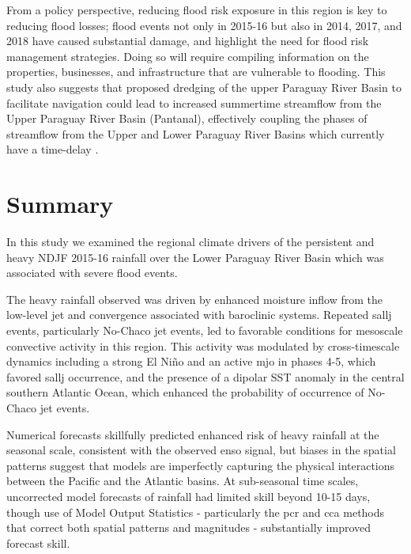 \documentclass[twocol]{ametsoc}
\begin{document}
From a policy perspective, reducing flood risk exposure in this region is key to reducing flood losses; flood events not only in 2015-16 but also in 2014, 2017, and 2018 have caused substantial damage, and highlight the need for flood risk management strategies.
Doing so will require compiling information on the properties, businesses, and infrastructure that are vulnerable to flooding.
This study also suggests that proposed dredging of the upper Paraguay River Basin to facilitate navigation could lead to increased summertime streamflow from the Upper Paraguay River Basin (Pantanal), effectively coupling the phases of streamflow from the Upper and Lower Paraguay River Basins which currently have a time-delay \citep{Bravo2011}.


\section{Summary} \label{sec:summary}

In this study we examined the regional climate drivers of the persistent and heavy NDJF 2015-16 rainfall over the Lower Paraguay River Basin which was associated with severe flood events.

The heavy rainfall observed was driven by enhanced moisture inflow from the low-level jet and convergence associated with baroclinic systems.
Repeated \gls{sallj} events, particularly No-Chaco jet events, led to favorable conditions for mesoscale convective activity in this region.
This activity was modulated by cross-timescale dynamics including a strong El Ni\~{n}o and an active \gls{mjo}  in phases 4-5, which favored \gls{sallj} occurrence, and the presence of a dipolar SST anomaly in the central southern Atlantic Ocean, which enhanced the probability of occurrence of No-Chaco jet events.

Numerical forecasts skillfully predicted enhanced risk of heavy rainfall at the seasonal scale, consistent with the observed \gls{enso} signal, but biases in the spatial patterns suggest that models are imperfectly capturing the physical interactions between the Pacific and the Atlantic basins.
At sub-seasonal time scales, uncorrected model forecasts of rainfall had limited skill beyond 10-15 days, though use of Model Output Statistics - particularly the \gls{pcr} and \gls{cca} methods that correct both spatial patterns and magnitudes - substantially improved forecast skill.
\end{document}
